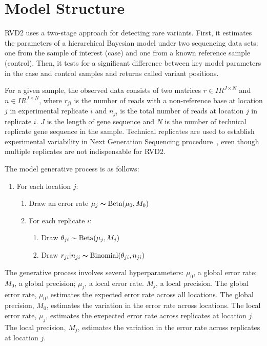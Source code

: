 \documentclass{bioinfo}
\newcommand{\RR}{I\!\!R} %
\begin{document}
\section{Model Structure}\label{sec:model_structure}

RVD2 uses a two-stage approach for detecting rare variants. First, it estimates the parameters of a hierarchical Bayesian model under two sequencing data sets: one from the sample of interest (case) and one from a known reference sample (control). Then, it tests for a significant difference between key model parameters in the case and control samples and returns called variant positions.

For a given sample, the observed data consists of two matrices $r \in \RR^{J \times N}$ and $n \in \RR^{J \times N}$, where $r_{ji}$ is the number of reads with a non-reference base at location $j$ in experimental replicate $i$ and $n_{ji}$ is the total number of reads at location $j$ in replicate $i$. $ J $ is the length of gene sequence and $ N $ is the number of technical replicate gene sequence in the sample.  \label{replicate definition} Technical replicates are used to establish experimental variability in Next Generation Sequencing procedure~\citep{quackenbush2002microarray,robasky2013role}, even though multiple replicates are not indispensable for RVD2.

The model generative process is as follows:

\begin{enumerate}[noitemsep]
	\item For each location $j$:
	\begin{enumerate}
		\item Draw an error rate $\mu_j \thicksim \text{Beta}(\mu_0, M_0)$
		\item For each replicate $i$:
		\begin{enumerate}
			\item Draw $\theta_{ji} \thicksim \text{Beta}(\mu_j, M_j)$
			\item Draw $r_{ji} | n_{ji} \thicksim \text{Binomial}(\theta_{ji}, n_{ji})$
		\end{enumerate}
	\end{enumerate}
\end{enumerate}


The generative process involves several hyperparameters: $\mu_0$, a global error rate; $M_0$, a global precision;  $ \mu_j $, a local error rate. $M_j$, a local precision. The global error rate, $\mu_0$, estimates the expected error rate across all locations. The global precision, $M_0$, estimates the variation in the error rate  across locations. The local error rate, $ \mu_j $, estimates the exepected error rate across replicates at location $ j $. The local precision, $M_j$, estimates the variation in the error rate across replicates at location $j$.
\end{document}
